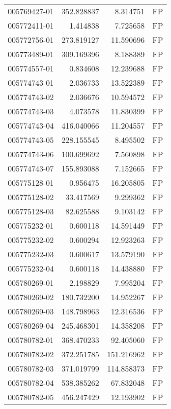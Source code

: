 \begin{tabular}{lrrl}
005769427-01 &  352.828837 &       8.314751 &   FP \\
005772411-01 &    1.414838 &       7.725658 &   FP \\
005772756-01 &  273.819127 &      11.590696 &   FP \\
005773489-01 &  309.169396 &       8.188389 &   FP \\
005774557-01 &    0.834608 &      12.239688 &   FP \\
005774743-01 &    2.036733 &      13.522389 &   FP \\
005774743-02 &    2.036676 &      10.594572 &   FP \\
005774743-03 &    4.073578 &      11.830399 &   FP \\
005774743-04 &  416.040066 &      11.204557 &   FP \\
005774743-05 &  228.155545 &       8.495502 &   FP \\
005774743-06 &  100.699692 &       7.560898 &   FP \\
005774743-07 &  155.893088 &       7.152665 &   FP \\
005775128-01 &    0.956475 &      16.205805 &   FP \\
005775128-02 &   33.417569 &       9.299362 &   FP \\
005775128-03 &   82.625588 &       9.103142 &   FP \\
005775232-01 &    0.600118 &      14.591449 &   FP \\
005775232-02 &    0.600294 &      12.923263 &   FP \\
005775232-03 &    0.600617 &      13.579190 &   FP \\
005775232-04 &    0.600118 &      14.438880 &   FP \\
005780269-01 &    2.198829 &       7.995204 &   FP \\
005780269-02 &  180.732200 &      14.952267 &   FP \\
005780269-03 &  148.798963 &      12.316536 &   FP \\
005780269-04 &  245.468301 &      14.358208 &   FP \\
005780782-01 &  368.470233 &      92.405060 &   FP \\
005780782-02 &  372.251785 &     151.216962 &   FP \\
005780782-03 &  371.019799 &     114.858373 &   FP \\
005780782-04 &  538.385262 &      67.832048 &   FP \\
005780782-05 &  456.247429 &      12.193902 &   FP \\

\end{tabular}
